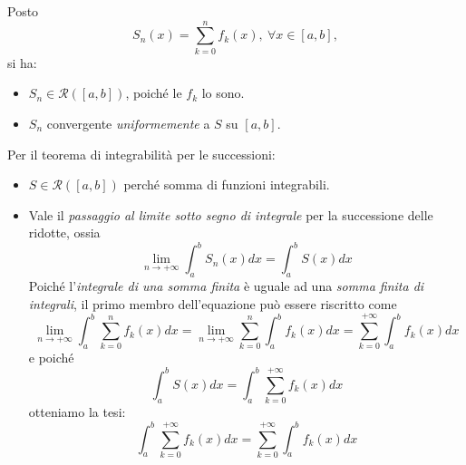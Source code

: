 \begin{demonstration}
	Posto
	\begin{equation*}
		S_n(x)=\sum_{k=0}^{n}f_k(x),\ \forall x\in \left[a,b\right],
	\end{equation*}
si ha:
	\begin{itemize}
		\item $S_n\in\mathcal{R}\left(\left[a,b\right]\right)$, poiché le $f_k$ lo sono.
		\item $S_n$ convergente \textit{uniformemente} a $S$ su $\left[a,b\right]$.
	\end{itemize}
	Per il teorema di integrabilità per le successioni:
	\begin{itemize}
		\item $S\in\mathcal{R}\left(\left[a,b\right]\right)$ perché somma di funzioni integrabili.
		\item Vale il \textit{passaggio al limite sotto segno di integrale} per la successione delle ridotte, ossia
		\begin{equation*}
			\lim_{n\to+\infty}\int_{a}^{b}S_n(x)dx=\int_{a}^{b}S(x)dx
		\end{equation*}
		Poiché l'\textit{integrale di una somma finita} è uguale ad una \textit{somma finita di integrali}, il primo membro dell'equazione può essere riscritto come
		\begin{equation*}
			\lim_{n\to+\infty}\int_{a}^{b}\sum_{k=0}^{n}f_k(x)dx=\lim_{n\to+\infty}\sum_{k=0}^{n}\int_{a}^{b}f_k(x)dx=\sum_{k=0}^{+\infty}\int_{a}^{b}f_k(x)dx
		\end{equation*}
		e poiché
		\begin{equation*}
			\int_{a}^{b}S(x)dx=\int_{a}^{b}\sum_{k=0}^{+\infty}f_k(x)dx
		\end{equation*}
		otteniamo la tesi:
		\begin{equation*}
			\int_{a}^{b}\sum_{k=0}^{+\infty}f_k(x)dx=\sum_{k=0}^{+\infty}\int_{a}^{b}f_k(x)dx
		\end{equation*}
	\end{itemize}
\end{demonstration}
